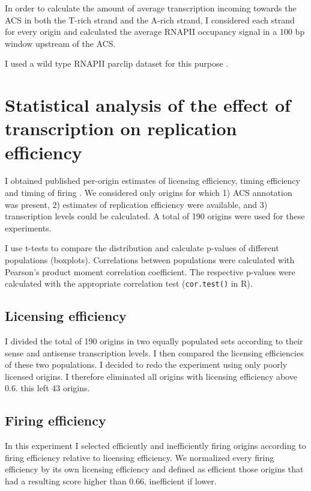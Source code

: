 In order to calculate the amount of average transcription incoming towards the ACS in both the T-rich strand and the A-rich strand, I considered each strand for every origin and calculated the average RNAPII occupancy signal in a 100 bp window upstream of the ACS.

I used a wild type RNAPII parclip dataset for this purpose \cite{schaughency:2014:genomewide}.

\section*{Statistical analysis of the effect of transcription on replication efficiency}

I obtained published per-origin estimates of licensing efficiency, timing efficiency and timing of firing \cite{hawkins:2013:highresolution}. 
We considered only origins for which 1) ACS annotation was present, 2) estimates of replication efficiency were available, and 3)  transcription levels could be calculated. 
A total of 190 origins were used for these experiments.

I use t-tests to compare the distribution and calculate p-values of different populations (boxplots). Correlations between populations were calculated with Pearson’s product moment correlation coefficient. The respective p-values were calculated with the appropriate correlation test (\texttt{cor.test()} in R).

\subsection*{Licensing efficiency}
I divided the total of 190 origins in two equally populated sets according to their sense and antisense transcription levels. I then compared the licensing efficiencies of these two populations.
I decided to redo the experiment using only poorly licensed origins. I therefore eliminated all origins with licensing efficiency above 0.6. this left 43 origins.

\subsection*{Firing efficiency}

In this experiment I selected efficiently and inefficiently firing origins according to firing efficiency relative to licensing efficiency. We normalized every firing efficiency by its own licensing efficiency and defined as efficient those origins that had a resulting score higher than 0.66, inefficient if lower.

